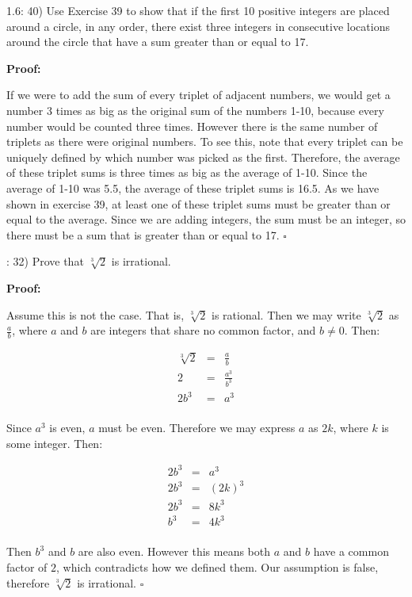 \documentclass{article}
\newenvironment{proof}
{\color{PineGreen}\begin{list}{}%
         {\setlength{\leftmargin}{1cm}}%
         \item[]%
        \textbf{Proof:}
        
        }
{ $\square$\end{list}}
\begin{document}
1.6: 40) Use Exercise 39 to show that if the first 10 positive integers are placed around a circle, in any order, there exist three integers in consecutive locations around the circle that have a sum greater than or equal to 17.
\begin{proof}
If we were to add the sum of every triplet of adjacent numbers, we would get a number 3 times as big as the original sum of the numbers 1-10, because every number would be counted three times. However there is the same number of triplets as there were original numbers. To see this, note that every triplet can be uniquely defined by which number was picked as the first. Therefore, the average of these triplet sums is three times as big as the average of 1-10. Since the average of 1-10 was 5.5, the average of these triplet sums is 16.5. As we have shown in exercise 39, at least one of these triplet sums must be greater than or equal to the average. Since we are adding integers, the sum must be an integer, so there must be a sum that is greater than or equal to 17.
\end{proof}
1.7: 32) Prove that $\sqrt[3]{2}$ is irrational.

\begin{proof}
Assume this is not the case. That is, $\sqrt[3]{2}$ is rational. Then we may write $\sqrt[3]{2}$ as $\frac{a}{b}$, where $a$ and $b$ are integers that share no common factor, and $b\neq 0$. Then:

\[\begin{array}{rcl}
\sqrt[3]{2} &=& \frac{a}{b}\\
2 &=& \frac{a^3}{b^3}\\
2b^3 &=& a^3\\
\end{array}\]

Since $a^3$ is even, $a$ must be even. Therefore we may express $a$ as $2k$, where $k$ is some integer. Then: 

\[\begin{array}{rcl}
2b^3 &=& a^3\\
2b^3 &=& (2k)^3\\
2b^3 &=& 8k^3\\
b^3 &=& 4k^3\\
\end{array}\]

Then $b^3$ and $b$ are also even. However this means both $a$ and $b$ have a common factor of $2$, which contradicts how we defined them. Our assumption is false, therefore $\sqrt[3]{2}$ is irrational.
\end{proof}
\end{document}
